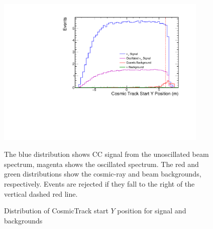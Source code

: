 \begin{figure}[t]
\begin{center}
\includegraphics[width=0.9\textwidth]{figures/selection/n1_cosStartY.pdf}
\end{center}
\caption{Distribution of CosmicTrack start $Y$ position for signal and backgrounds}{
The blue distribution shows \numu CC signal from the unoscillated beam spectrum,
magenta shows the oscillated spectrum.
The red and green distributions show the cosmic-ray and beam backgrounds,
respectively.  Events are rejected if they fall to the right of the vertical
dashed red line.
}
\label{cosStartY}
\end{figure}

